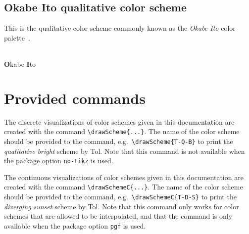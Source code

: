 \documentclass{scrartcl}
\newcommand\marg[1]{\leavevmode\marginpar{\raggedleft #1}}
\begin{document}
\subsection{Okabe Ito qualitative color scheme}\label{sec:OkabeIto}
This is the qualitative color scheme commonly known as the \emph{Okabe Ito} color palette~\cite{Ichihara_2008}.

\begin{center}
    \\
    \textbf{O}kabe \textbf{I}to
\end{center}

\section{Provided commands}
\cprotect\marg{\verb!\drawScheme{...}!}%
The discrete visualizations of color schemes given in this documentation are created with the command \verb!\drawScheme{...}!.
The name of the color scheme should be provided to the command, e.g.\ \verb!\drawScheme{T-Q-B}! to print the \emph{qualitative bright} scheme by Tol.
Note that this command is not available when the package option \verb!no-tikz! is used.

\cprotect\marg{\verb!\drawSchemeC{...}!}%
The continuous visualizations of color schemes given in this documentation are created with the command \verb!\drawSchemeC{...}!.
The name of the color scheme should be provided to the command, e.g.\ \verb!\drawSchemeC{T-D-S}! to print the \emph{diverging sunset} scheme by Tol.
Note that this command only works for color schemes that are allowed to be interpolated, and that the command is only available when the package option \verb!pgf! is used.

\clearpage
\printbibliography
\end{document}
